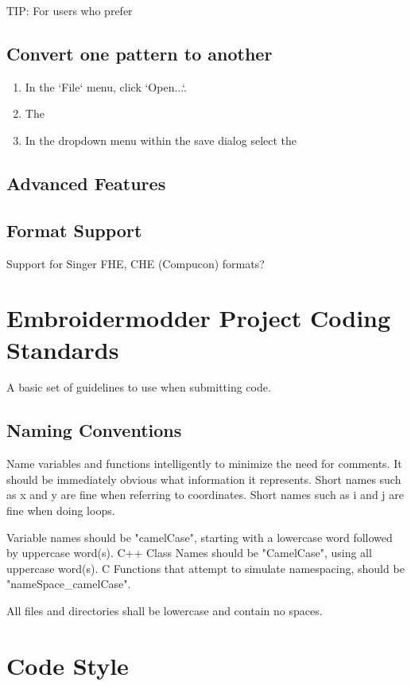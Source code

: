 \documentclass{report}
\begin{document}
TIP: For users who prefer

\subsection{Convert one pattern to another}

\begin{enumerate}
\item In the `File` menu, click `Open...`.
\item The
\item In the dropdown menu within the save dialog select the
\end{enumerate}

\subsection{Advanced Features}


\subsection{Format Support}

Support for Singer FHE, CHE (Compucon) formats?

\section{Embroidermodder Project Coding Standards}

A basic set of guidelines to use when submitting code.

\subsection{Naming Conventions}

Name variables and functions intelligently to minimize the need for
comments. It should be immediately obvious what information it
represents. Short names such as x and y are fine when referring to
coordinates. Short names such as i and j are fine when doing loops.

Variable names should be "camelCase", starting with a lowercase word
followed by uppercase word(s). C++ Class Names should be "CamelCase",
using all uppercase word(s). C Functions that attempt to simulate namespacing, should be "nameSpace\_camelCase".

All files and directories shall be lowercase and contain no spaces.

\section{Code Style}
\end{document}
